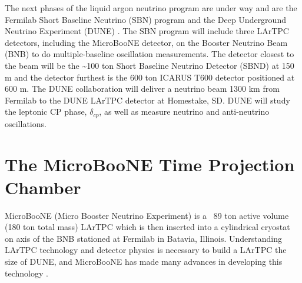 The next phases of the liquid argon neutrino program are under way and are the Fermilab Short Baseline Neutrino (SBN) program \cite{sbn} and the Deep Underground Neutrino Experiment (DUNE) \cite{dune}. The SBN program will include three LArTPC detectors, including the MicroBooNE detector, on the Booster Neutrino Beam (BNB) to do multiple-baseline oscillation measurements. The detector closest to the beam will be the \sim 100 ton Short Baseline Neutrino Detector (SBND)\cite{sbnd} at 150 m and the detector furthest is the 600 ton ICARUS T600 \cite{icarus_t600} detector positioned at 600 m. The DUNE collaboration will deliver a neutrino beam 1300 km from Fermilab to the DUNE LArTPC detector at Homestake, SD. DUNE will study the leptonic CP phase, $\delta_{cp}$, as well as measure neutrino and anti-neutrino oscillations. 
\section{The MicroBooNE Time Projection Chamber}
MicroBooNE \cite{microboone}(Micro Booster Neutrino Experiment) is a ~89 ton active volume (180 ton total mass) LArTPC which is then inserted into a cylindrical cryostat on axis of the BNB stationed at Fermilab in Batavia, Illinois. Understanding LArTPC technology and detector physics is necessary to build a LArTPC the size of DUNE, and MicroBooNE has made many advances in developing this technology\cite{noisechar} \cite{michel}. 

